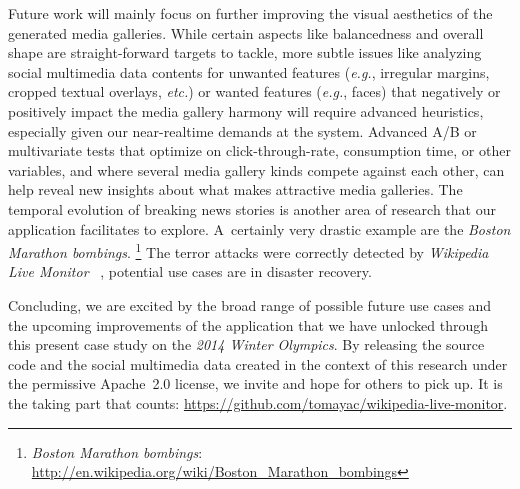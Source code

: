 \documentclass{sig-alternate-somus}
\newcommand{\inlinelistingsize}{\fontsize{8pt}{11pt}}
\let\oldurl\url
\renewcommand{\url}[1]{\inlinelistingsize\oldurl{#1}}
\begin{document}
Future work will mainly focus on further improving the visual aesthetics
of the generated media galleries.
While certain aspects like balancedness and overall shape
are straight-forward targets to tackle,
more subtle issues like analyzing social multimedia data contents
for unwanted features (\emph{e.g.}, irregular margins,
cropped textual overlays, \emph{etc.})
or wanted features (\emph{e.g.}, faces)
that negatively or positively impact the media gallery harmony
will require advanced heuristics,
especially given our near-realtime demands at the system.
Advanced A/B or multivariate tests that optimize on click-through-rate,
consumption time, or other variables,
and where several media gallery kinds compete against each other,
can help reveal new insights about what makes attractive media galleries.
The temporal evolution of breaking news stories is
another area of research that our application facilitates to explore.
A~certainly very drastic example are the \emph{Boston Marathon bombings}.%
\footnote{\emph{Boston Marathon bombings}:
\url{http://en.wikipedia.org/wiki/Boston_Marathon_bombings}}
The terror attacks were correctly detected by \emph{Wikipedia Live Monitor}%
~\cite{bea2013wikilivemon}, potential use cases are in disaster recovery.

Concluding, we are excited by the broad range
of possible future use cases
and the upcoming improvements of the application
that we have unlocked through this present case study
on the \emph{2014 Winter Olympics}.
By releasing the source code and the social multimedia data 
created in the context of this research under the permissive
Apache~2.0 license, we invite and hope for others to pick up.
It is the taking part that counts:
\url{https://github.com/tomayac/wikipedia-live-monitor}.
\end{document}
